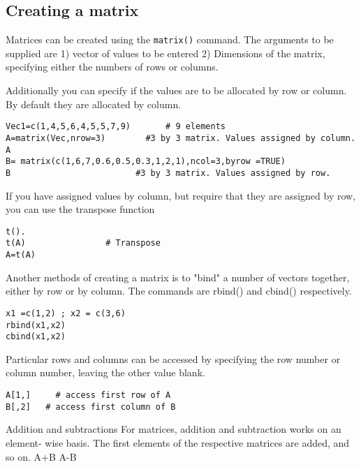 \subsection{Creating a matrix}
Matrices can be created using the \texttt{matrix()} command. The arguments to be supplied are 1) vector of values to be entered
2) Dimensions of the matrix, specifying either the numbers of rows or columns.

Additionally you can specify if the values are to be allocated by row or column. By default they are allocated by column.
\begin{verbatim}
Vec1=c(1,4,5,6,4,5,5,7,9)		# 9 elements
A=matrix(Vec,nrow=3)		#3 by 3 matrix. Values assigned by column.
A
B= matrix(c(1,6,7,0.6,0.5,0.3,1,2,1),ncol=3,byrow =TRUE)
B				          #3 by 3 matrix. Values assigned by row.
\end{verbatim}	
If you have assigned values by column, but require that they are assigned by row, you can use the transpose function
\begin{verbatim}
t().
t(A)				# Transpose
A=t(A)	
\end{verbatim}

Another methods of creating a matrix is to "bind" a number of vectors together, either by row or by column. The commands are rbind() and cbind() respectively.
\begin{verbatim}
x1 =c(1,2) ; x2 = c(3,6)
rbind(x1,x2)
cbind(x1,x2)
\end{verbatim}




Particular rows and columns can be accessed by specifying the row number or column number, leaving the other value blank.
\begin{verbatim}
A[1,]	  # access first row of A
B[,2]   # access first column of B
\end{verbatim}
Addition and subtractions
For matrices, addition and subtraction works on an element- wise basis. The first elements of the respective matrices are added, and so on.
A+B
A-B
